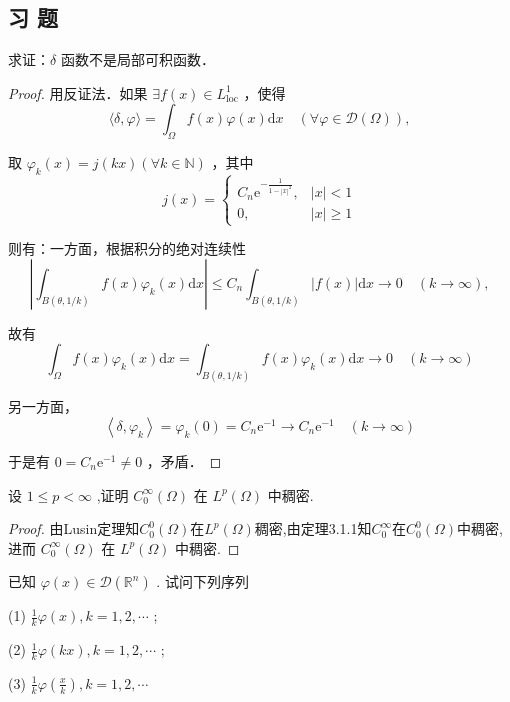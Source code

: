 \documentclass[lang=cn,newtx,10pt,scheme=chinese,thmcnt=chapter]{elegantbook}
\begin{document}
\subsection{习 题}
\begin{problemset}
\item  求证：$\delta$ 函数不是局部可积函数．
\begin{proof}
    用反证法．如果 $\exists f(x) \in L_{\mathrm{loc}}^1$ ，使得
$$
\langle\delta, \varphi\rangle=\int_{\Omega} f(x) \varphi(x) \mathrm{d} x \quad(\forall \varphi \in \mathcal{D}(\Omega)),
$$

取 $\varphi_k(x)=j(k x)(\forall k \in \mathbb{N})$ ，其中
$$
j(x)= \begin{cases}C_n \mathrm{e}^{-\frac{1}{1-|x|^2}}, & |x|<1 \\ 0, & |x| \geqslant 1\end{cases}
$$

则有：一方面，根据积分的绝对连续性
$$
\left|\int_{B(\theta, 1 / k)} f(x) \varphi_k(x) \mathrm{d} x\right| \leqslant C_n \int_{B(\theta, 1 / k)}|f(x)| \mathrm{d} x \rightarrow 0 \quad(k \rightarrow \infty),
$$


故有
$$
\int_{\Omega} f(x) \varphi_k(x) \mathrm{d} x=\int_{B(\theta, 1 / k)} f(x) \varphi_k(x) \mathrm{d} x \rightarrow 0 \quad(k \rightarrow \infty)
$$

另一方面，
$$
\left\langle\delta, \varphi_k\right\rangle=\varphi_k(0)=C_n \mathrm{e}^{-1} \rightarrow C_n \mathrm{e}^{-1} \quad(k \rightarrow \infty)
$$

于是有 $0=C_n \mathrm{e}^{-1} \neq 0$ ，矛盾．
\end{proof}
\item 设 \(1 \leqslant  p < \infty\) ,证明 \({C}_{0}^{\infty }\left( \Omega \right)\) 在 \({L}^{p}\left( \Omega \right)\) 中稠密.
\begin{proof}
   由Lusin定理知$C_0^0(\Omega)$在$L^p(\Omega)$稠密,由定理3.1.1知$C_0^\infty$在$C^0_0(\Omega)$中稠密,进而 \({C}_{0}^{\infty }\left( \Omega \right)\) 在 \({L}^{p}\left( \Omega \right)\) 中稠密.
\end{proof}
\item 已知 \(\varphi \left( x\right)  \in  \mathcal{D}\left( {\mathbb{R}}^{n}\right)\) . 试问下列序列

(1) \(\frac{1}{k}\varphi \left( x\right) ,k = 1,2,\cdots\) ;

(2) \(\frac{1}{k}\varphi \left( {kx}\right) ,k = 1,2,\cdots\) ;

(3) \(\frac{1}{k}\varphi \left( \frac{x}{k}\right) ,k = 1,2,\cdots\)


\end{problemset}
\end{document}
